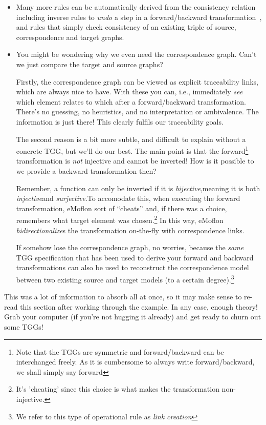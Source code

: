 \begin{itemize}

\item Many more rules can be automatically derived from the consistency relation including inverse rules to \emph{undo} a step in a forward/backward
transformation~\cite{LAVS_ICGT_2012}, and rules that simply check consistency of an existing triple of source, correspondence and target graphs.

\item You might be wondering why we even need the correspondence graph. Can't we just compare the target and source graphs? 

Firstly, the correspondence graph can be viewed as explicit traceability links, which are always nice to have. With these you can, i.e., immediately \emph{see}
which element relates to which after a forward/backward transformation. There's no guessing, no heuristics, and no interpretation or ambivalence. The
information is just there! This clearly fulfils our traceability goals.

The second reason is a bit more subtle, and difficult to explain without a concrete TGG, but we'll do our best. The main point is that the forward\footnote{Note
that the TGGs are symmetric and forward/backward can be interchanged freely.  As it is cumbersome to always write forward/backward, we shall simply say
forward} transformation is \emph{not} injective and cannot be inverted! How is it possible to we provide a backward transformation then?

Remember, a function can only be inverted if it is \emph{bijective},meaning it is both \emph{injective}and
\emph{surjective}.To accomodate this, when executing the forward transformation, eMoflon sort of ``cheats'' and, if there was a choice,
remembers what target element was chosen.\footnote{It's 'cheating' since this choice is what makes the transformation non-injective.} In this way, eMoflon
\emph{bidirectionalize}s the transformation on-the-fly with correspondence links.

If somehow lose the correspondence graph, no worries, because the \emph{same} TGG specification that has been used to derive your forward and backward
transformations can also be used to reconstruct the correspondence model between two existing source and target models (to a certain degree).\footnote{We refer
to this type of operational rule as \emph{link creation}}

\end{itemize}
This was a lot of information to absorb all at once, so it may make sense to re-read this section after working through the example. In any case, enough theory!
Grab your computer (if you're not hugging it already) and get ready to churn out some TGGs!
